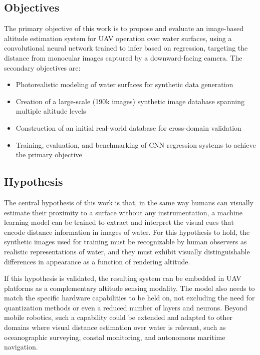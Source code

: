 \subsection{Objectives}

The primary objective of this work is to propose and evaluate an image-based altitude estimation system for UAV operation over water surfaces, using a convolutional neural network trained to infer based on regression, targeting the distance from monocular images captured by a downward-facing camera. The secondary objectives are:

\begin{itemize}
\item Photorealistic modeling of water surfaces for synthetic data generation
\item Creation of a large-scale (190k images) synthetic image database spanning multiple altitude levels
\item Construction of an initial real-world database for cross-domain validation
\item Training, evaluation, and benchmarking of CNN regression systems to achieve the primary objective
\end{itemize}

\subsection{Hypothesis}

The central hypothesis of this work is that, in the same way humans can visually estimate their proximity to a surface without any instrumentation, a machine learning model can be trained to extract and interpret the visual cues that encode distance information in images of water. For this hypothesis to hold, the synthetic images used for training must be recognizable by human observers as realistic representations of water, and they must exhibit visually distinguishable differences in appearance as a function of rendering altitude.

If this hypothesis is validated, the resulting system can be embedded in UAV platforms as a complementary altitude sensing modality. The model also needs to match the specific hardware capabilities to be held on, not excluding the need for quantization methods or even a reduced number of layers and neurons. Beyond mobile robotics, such a capability could be extended and adapted to other domains where visual distance estimation over water is relevant, such as oceanographic surveying, coastal monitoring, and autonomous maritime navigation.


